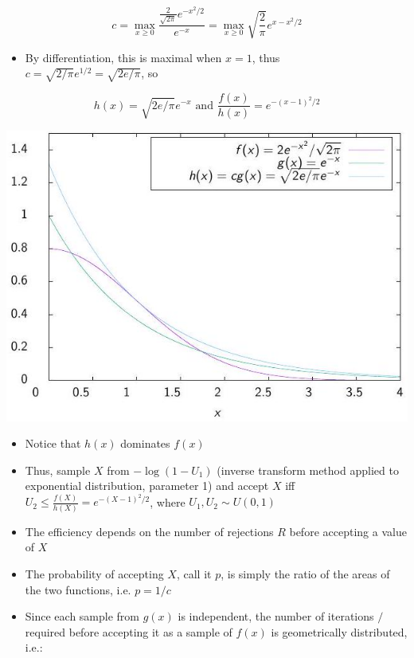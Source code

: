 \documentclass[10pt]{article}
\begin{document}
$$
c=\max _{x \geq 0} \frac{\frac{2}{\sqrt{2 \pi}} e^{-x^{2} / 2}}{e^{-x}}=\max _{x \geq 0} \sqrt{\frac{2}{\pi}} e^{x-x^{2} / 2}
$$

\begin{itemize}
  \item By differentiation, this is maximal when $x=1$, thus\\
$c=\sqrt{2 / \pi} e^{1 / 2}=\sqrt{2 e / \pi}$, so
\end{itemize}

$$
h(x)=\sqrt{2 e / \pi} e^{-x} \text { and } \frac{f(x)}{h(x)}=e^{-(x-1)^{2} / 2}
$$

\begin{center}
\includegraphics[max width=\textwidth]{2025_05_12_520db7cd238ba7b44f0fg-41}
\end{center}

\begin{itemize}
  \item Notice that $h(x)$ dominates $f(x)$
  \item Thus, sample $X$ from $-\log \left(1-U_{1}\right)$ (inverse transform method applied to exponential distribution, parameter 1) and accept $X$ iff $U_{2} \leq \frac{f(X)}{h(X)}=e^{-(X-1)^{2} / 2}$, where $U_{1}, U_{2} \sim U(0,1)$
  \item The efficiency depends on the number of rejections $R$ before accepting a value of $X$
  \item The probability of accepting $X$, call it $p$, is simply the ratio of the areas of the two functions, i.e. $p=1 / c$
  \item Since each sample from $g(x)$ is independent, the number of iterations $/$ required before accepting it as a sample of $f(x)$ is geometrically distributed, i.e.:
\end{itemize}
\end{document}

